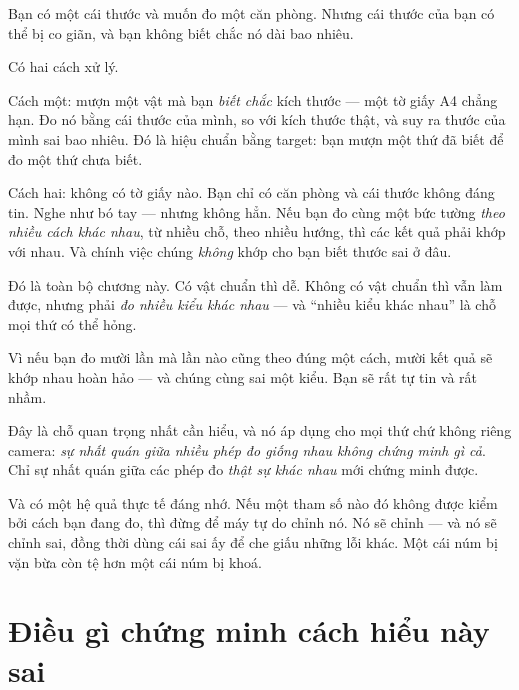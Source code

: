 \documentclass[../../vslam.tex]{subfiles}
\begin{document}
\begin{dongian}
Bạn có một cái thước và muốn đo một căn phòng. Nhưng cái thước của bạn có thể bị co giãn, và bạn không biết chắc nó dài bao nhiêu.

Có hai cách xử lý.

Cách một: mượn một vật mà bạn \emph{biết chắc} kích thước --- một tờ giấy A4 chẳng hạn. Đo nó bằng cái thước của mình, so với kích thước thật, và suy ra thước của mình sai bao nhiêu. Đó là hiệu chuẩn bằng target: bạn mượn một thứ đã biết để đo một thứ chưa biết.

Cách hai: không có tờ giấy nào. Bạn chỉ có căn phòng và cái thước không đáng tin. Nghe như bó tay --- nhưng không hẳn. Nếu bạn đo cùng một bức tường \emph{theo nhiều cách khác nhau}, từ nhiều chỗ, theo nhiều hướng, thì các kết quả phải khớp với nhau. Và chính việc chúng \emph{không} khớp cho bạn biết thước sai ở đâu.

Đó là toàn bộ chương này. Có vật chuẩn thì dễ. Không có vật chuẩn thì vẫn làm được, nhưng phải \emph{đo nhiều kiểu khác nhau} --- và ``nhiều kiểu khác nhau'' là chỗ mọi thứ có thể hỏng.

Vì nếu bạn đo mười lần mà lần nào cũng theo đúng một cách, mười kết quả sẽ khớp nhau hoàn hảo --- và chúng cùng sai một kiểu. Bạn sẽ rất tự tin và rất nhầm.

Đây là chỗ quan trọng nhất cần hiểu, và nó áp dụng cho mọi thứ chứ không riêng camera: \emph{sự nhất quán giữa nhiều phép đo giống nhau không chứng minh gì cả}. Chỉ sự nhất quán giữa các phép đo \emph{thật sự khác nhau} mới chứng minh được.

Và có một hệ quả thực tế đáng nhớ. Nếu một tham số nào đó không được kiểm bởi cách bạn đang đo, thì đừng để máy tự do chỉnh nó. Nó sẽ chỉnh --- và nó sẽ chỉnh sai, đồng thời dùng cái sai ấy để che giấu những lỗi khác. Một cái núm bị vặn bừa còn tệ hơn một cái núm bị khoá.

\end{dongian}

\section{Điều gì chứng minh cách hiểu này sai}
\end{document}

